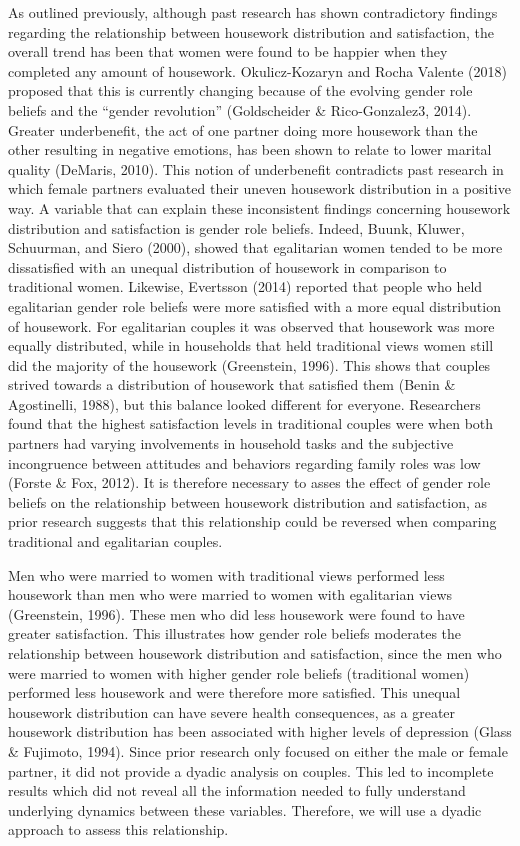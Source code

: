 \documentclass[
  man,floatsintext]{apa6}
\begin{document}
As outlined previously, although past research has shown contradictory findings regarding the relationship between housework distribution and satisfaction, the overall trend has been that women were found to be happier when they completed any amount of housework. Okulicz-Kozaryn and Rocha Valente (2018) proposed that this is currently changing because of the evolving gender role beliefs and the ``gender revolution'' (Goldscheider \& Rico-Gonzalez3, 2014). Greater underbenefit, the act of one partner doing more housework than the other resulting in negative emotions, has been shown to relate to lower marital quality (DeMaris, 2010). This notion of underbenefit contradicts past research in which female partners evaluated their uneven housework distribution in a positive way. A variable that can explain these inconsistent findings concerning housework distribution and satisfaction is gender role beliefs. Indeed, Buunk, Kluwer, Schuurman, and Siero (2000), showed that egalitarian women tended to be more dissatisfied with an unequal distribution of housework in comparison to traditional women. Likewise, Evertsson (2014) reported that people who held egalitarian gender role beliefs were more satisfied with a more equal distribution of housework. For egalitarian couples it was observed that housework was more equally distributed, while in households that held traditional views women still did the majority of the housework (Greenstein, 1996). This shows that couples strived towards a distribution of housework that satisfied them (Benin \& Agostinelli, 1988), but this balance looked different for everyone. Researchers found that the highest satisfaction levels in traditional couples were when both partners had varying involvements in household tasks and the subjective incongruence between attitudes and behaviors regarding family roles was low (Forste \& Fox, 2012). It is therefore necessary to asses the effect of gender role beliefs on the relationship between housework distribution and satisfaction, as prior research suggests that this relationship could be reversed when comparing traditional and egalitarian couples.

Men who were married to women with traditional views performed less housework than men who were married to women with egalitarian views (Greenstein, 1996). These men who did less housework were found to have greater satisfaction. This illustrates how gender role beliefs moderates the relationship between housework distribution and satisfaction, since the men who were married to women with higher gender role beliefs (traditional women) performed less housework and were therefore more satisfied. This unequal housework distribution can have severe health consequences, as a greater housework distribution has been associated with higher levels of depression (Glass \& Fujimoto, 1994). Since prior research only focused on either the male or female partner, it did not provide a dyadic analysis on couples. This led to incomplete results which did not reveal all the information needed to fully understand underlying dynamics between these variables. Therefore, we will use a dyadic approach to assess this relationship.
\end{document}
